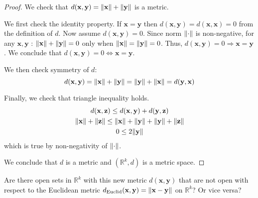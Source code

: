 \documentclass{article}
\newcommand{\R}{\mathbb{R}}
\newcommand{\vect}[1]{\mathbf{#1}}
\DeclarePairedDelimiter{\norm}{\lVert}{\rVert}
\begin{document}
\begin{proof}
We check that $d(\vect{x}, \vect{y}) = \norm{ \vect{x} } + \norm{ \vect{y} }$ is a metric.

We first check the identity property.
If $\vect{x} = \vect{y}$ then $d(\vect{x}, \vect{y}) = d(\vect{x}, \vect{x}) = 0$ from the definition of $d$.
Now assume $d(\vect{x}, \vect{y}) = 0$.
Since norm $\norm{ \cdot }$ is non-negative, for any $\vect{x}, \vect{y}$ : $\norm{ \vect{x} } + \norm{ \vect{y} } = 0$ only when $\norm{ \vect{x} } = \norm{ \vect{y} } = 0$.
Thus, $d(\vect{x}, \vect{y}) = 0 \Rightarrow \vect{x} = \vect{y}$. We conclude that $d(\vect{x}, \vect{y}) = 0 \iff \vect{x} = \vect{y}$.

We then check symmetry of $d$:
\[ d(\vect{x}, \vect{y}) = \norm{ \vect{x} } + \norm{ \vect{y} } = \norm{ \vect{y} } + \norm{ \vect{x} } = d(\vect{y}, \vect{x}) \]

Finally, we check that triangle inequality holds.
\begin{gather*}
    d(\vect{x}, \vect{z}) \leq d(\vect{x}, \vect{y}) + d(\vect{y}, \vect{z}) \\
    \norm{ \vect{x} } + \norm{ \vect{z} } \leq \norm{ \vect{x} } + \norm{ \vect{y} } + \norm{ \vect{y} } + \norm{ \vect{z} } \\
    0 \leq 2\norm{ \vect{y} }
\end{gather*}
which is true by non-negativity of $\norm{ \cdot }$.

We conclude that $d$ is a metric and $(\R^k, d)$ is a metric space.
\end{proof}

\begin{tcolorbox}
Are there open sets in $\R^k$ with this new metric $d(\vect{x}, \vect{y})$ that are not open with respect to the Euclidean metric $d_\text{Euclid}(\vect{x}, \vect{y}) = \norm{ \vect{x} - \vect{y} }$ on $\R^k$? Or vice versa?
\end{tcolorbox}
\end{document}
